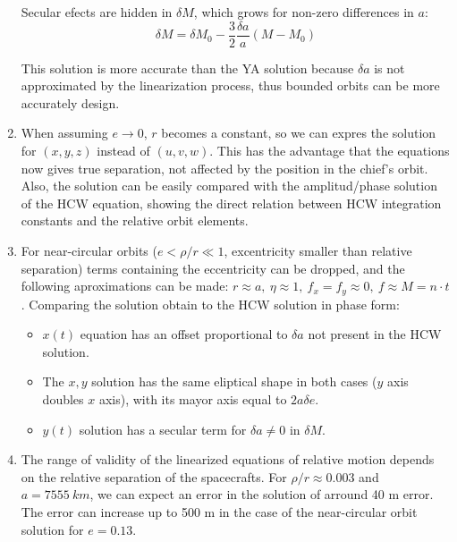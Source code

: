 \documentclass[a4paper]{article}
\begin{document}
\begin{enumerate}[label=\emph{\alph*)}]
    Secular efects are hidden in $\delta M$, which grows for non-zero differences in $a$:
    \[\delta M = \delta M_0 - \frac{3}{2}\frac{\delta a}{a}(M-M_0)\]

    This solution is more accurate than the YA solution because $\delta a$ is not approximated by the linearization process, thus bounded orbits can be more accurately design.

  \item %
    When assuming $e\rightarrow 0$, $r$ becomes a constant, so we can expres the solution for $(x,y,z)$ instead of $(u,v,w)$. This has the advantage that the equations now gives true separation, not affected by the position in the chief's orbit. Also, the solution can be easily compared with the amplitud/phase solution of the HCW equation, showing the direct relation between HCW integration constants and the relative orbit elements.

  \item %
    For near-circular orbits ($e<\rho/r\ll1$, excentricity smaller than relative separation) terms containing the eccentricity can be dropped, and the following aproximations can be made: $r\approx a, ~\eta \approx 1,~f_x = f_y \approx 0,~f\approx M=n\cdot t$. Comparing the solution obtain to the HCW solution in phase form:
    \begin{itemize}
      \item $x(t)$ equation has an offset proportional to $\delta a$ not present in the HCW solution.
      \item The $x,y$ solution has the same eliptical shape in both cases ($y$ axis doubles $x$ axis), with its mayor axis equal to $2a\delta e$.
      \item $y(t)$ solution has a secular term for $\delta a \neq 0$ in $\delta M$.
    \end{itemize}

  \item %
    The range of validity of the linearized equations of relative motion depends on the relative separation of the spacecrafts. For $\rho/r\approx 0.003$ and $a=7555~km$, we can expect an error in the solution of arround 40 m error. The error can increase up to 500 m in the case of the near-circular orbit solution for $e=0.13$.


\end{enumerate}
\end{document}
